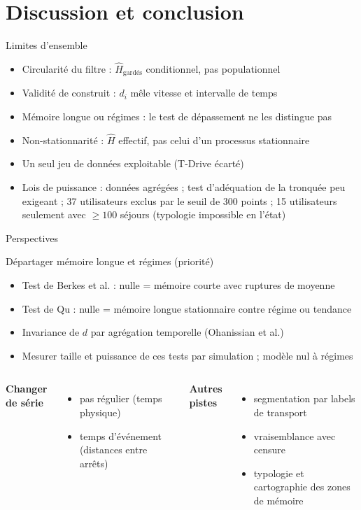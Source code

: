 \documentclass[aspectratio=169,11pt]{beamer}
\begin{document}
\section{Discussion et conclusion}

\begin{frame}{Limites d'ensemble}
\begin{itemize}
  \item \alert{Circularité} du filtre : $\hat H_{\mathrm{gardés}}$ conditionnel, pas populationnel
  \item \alert{Validité de construit} : $d_i$ mêle vitesse et intervalle de temps
  \item \alert{Mémoire longue ou régimes} : le test de dépassement ne les distingue pas
  \item \alert{Non-stationnarité} : $\hat H$ effectif, pas celui d'un processus stationnaire
  \item \alert{Un seul jeu de données} exploitable (T-Drive écarté)
  \item \alert{Lois de puissance} : données agrégées ; test d'adéquation de la tronquée peu exigeant ; 37 utilisateurs exclus par le seuil de 300 points ; 15 utilisateurs seulement avec $\ge100$ séjours (typologie impossible en l'état)
\end{itemize}
\end{frame}

\begin{frame}{Perspectives}
\begin{block}{Départager mémoire longue et régimes (priorité)}
\small
\begin{itemize}
  \item Test de Berkes et al. : nulle = mémoire courte avec ruptures de moyenne
  \item Test de Qu : nulle = mémoire longue stationnaire contre régime ou tendance
  \item Invariance de $d$ par agrégation temporelle (Ohanissian et al.)
  \item Mesurer taille et puissance de ces tests par simulation ; modèle nul à régimes
\end{itemize}
\end{block}
\begin{columns}[T]
\small
\textbf{Changer de série}
\begin{itemize}
  \item pas régulier (temps physique)
  \item temps d'événement (distances entre arrêts)
\end{itemize}
\small
\textbf{Autres pistes}
\begin{itemize}
  \item segmentation par labels de transport
  \item vraisemblance avec censure
  \item typologie et cartographie des zones de mémoire
\end{itemize}
\end{columns}
\end{frame}
\end{document}
